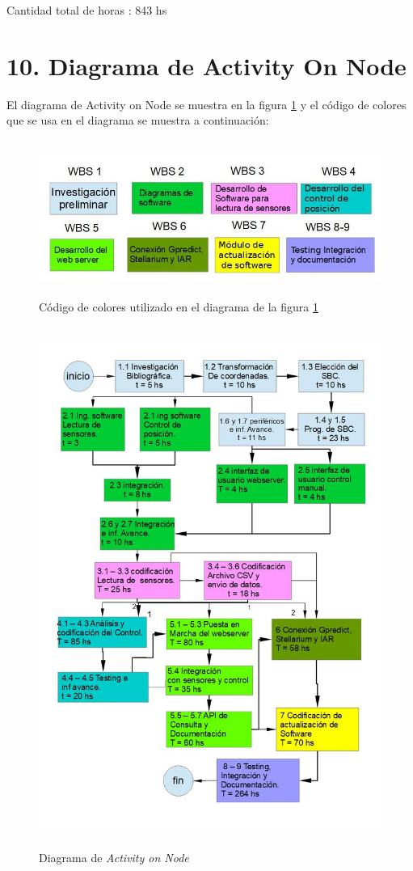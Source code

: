 \documentclass[11pt, %
codirector, %
]{charter}
\begin{document}
Cantidad total de horas :  843 hs  



\section{10. Diagrama de Activity On Node}
\label{sec:AoN}
El diagrama de Activity on Node se muestra en la figura \ref{fig:AoN} y el código de colores que se usa en el diagrama se muestra a continuación: 
\begin{figure}[H]
	\includegraphics[width = \textwidth,height = 5.1cm]{./Figuras/AonGantt/cod_colores.jpg}
	\caption{Código de colores utilizado en el diagrama de la figura \ref{fig:AoN}}
\end{figure} 

\begin{figure}[H]
\centering
\includegraphics[width = \textwidth, height = 17cm]{./Figuras/AonGantt/ActivityOnNode.jpg}
\caption{Diagrama de \textit{Activity on Node}}
\label{fig:AoN}
\end{figure}
\end{document}
